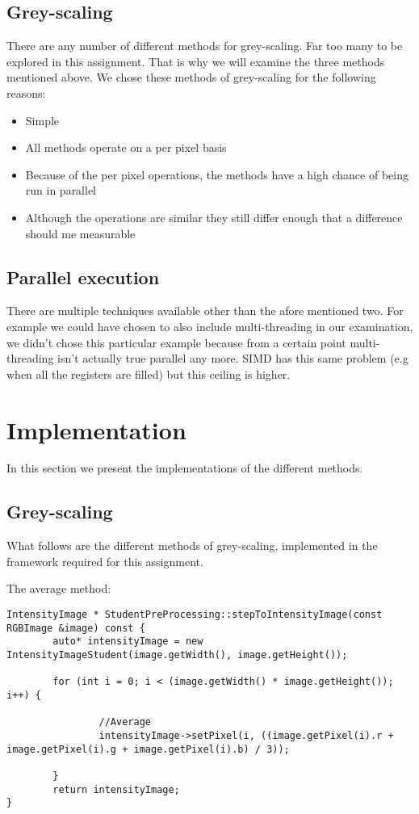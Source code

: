 \documentclass[a4paper]{article}
\begin{document}
\subsection{Grey-scaling}
There are any number of different methods for grey-scaling. Far too many to be explored in this assignment. That is why we will examine the three methods mentioned above.
We chose these methods of grey-scaling for the following reasons:

\begin{itemize}
\item Simple
\item All methods operate on a per pixel basis
\item Because of the per pixel operations, the methods have a high chance of being run in parallel
\item Although the operations are similar they still differ enough that a difference should me measurable
\end{itemize}

\subsection{Parallel execution}
There are multiple techniques available other than the afore mentioned two. For example we could have chosen to also include multi-threading in our examination, we didn't chose this particular example because from a certain point multi-threading isn't actually true parallel any more. SIMD has this same problem (e.g when all the registers are filled) but this ceiling is higher.

\newpage

\section{Implementation}
In this section we present the implementations of the different methods.

\subsection{Grey-scaling}
What follows are the different methods of grey-scaling, implemented in the framework required for this assignment.

The average method:
\lstset{language=C++}
\begin{lstlisting}
IntensityImage * StudentPreProcessing::stepToIntensityImage(const RGBImage &image) const {
        auto* intensityImage = new IntensityImageStudent(image.getWidth(), image.getHeight());

        for (int i = 0; i < (image.getWidth() * image.getHeight()); i++) {

                //Average
                intensityImage->setPixel(i, ((image.getPixel(i).r + image.getPixel(i).g + image.getPixel(i).b) / 3));

        }
        return intensityImage;
}

\end{lstlisting}
\end{document}
